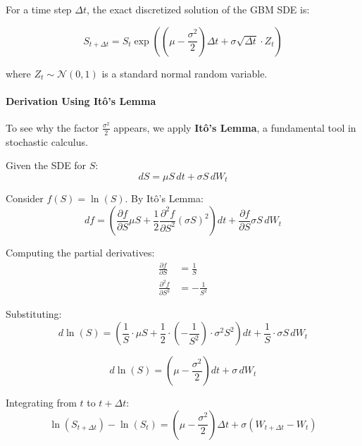 \documentclass[12pt,a4paper]{article}
\begin{document}
For a time step $\Delta t$, the exact discretized solution of the GBM SDE is:

\begin{tcolorbox}[colback=green!10, colframe=green!50, title=Discretized GBM]
\begin{equation}
\boxed{S_{t+\Delta t} = S_t \exp\left(\left(\mu - \frac{\sigma^2}{2}\right)\Delta t + \sigma \sqrt{\Delta t} \cdot Z_t\right)}
\end{equation}

where $Z_t \sim \mathcal{N}(0, 1)$ is a standard normal random variable.
\end{tcolorbox}

\paragraph{Derivation Using Itô's Lemma}

To see why the factor $\frac{\sigma^2}{2}$ appears, we apply \textbf{Itô's Lemma}, a fundamental tool in stochastic calculus.

Given the SDE for $S$:
\begin{equation}
dS = \mu S \, dt + \sigma S \, dW_t
\end{equation}

Consider $f(S) = \ln(S)$. By Itô's Lemma:
\begin{equation}
df = \left(\frac{\partial f}{\partial S} \mu S + \frac{1}{2} \frac{\partial^2 f}{\partial S^2} (\sigma S)^2\right) dt + \frac{\partial f}{\partial S} \sigma S \, dW_t
\end{equation}

Computing the partial derivatives:
\begin{align}
\frac{\partial f}{\partial S} &= \frac{1}{S} \\
\frac{\partial^2 f}{\partial S^2} &= -\frac{1}{S^2}
\end{align}

Substituting:
\begin{equation}
d\ln(S) = \left(\frac{1}{S} \cdot \mu S + \frac{1}{2} \cdot \left(-\frac{1}{S^2}\right) \cdot \sigma^2 S^2\right) dt + \frac{1}{S} \cdot \sigma S \, dW_t
\end{equation}

\begin{equation}
d\ln(S) = \left(\mu - \frac{\sigma^2}{2}\right) dt + \sigma \, dW_t
\end{equation}

Integrating from $t$ to $t + \Delta t$:
\begin{equation}
\ln(S_{t+\Delta t}) - \ln(S_t) = \left(\mu - \frac{\sigma^2}{2}\right) \Delta t + \sigma (W_{t+\Delta t} - W_t)
\end{equation}
\end{document}
